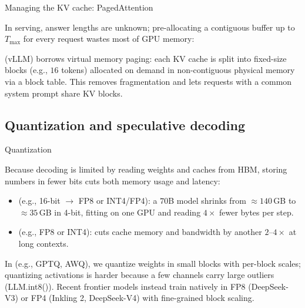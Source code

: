 \documentclass[11pt,aspectratio=169]{beamer}
\begin{document}
\begin{frame}{Managing the KV cache: PagedAttention}
    \setlength{\parskip}{4pt}

    In serving, answer lengths are unknown; pre-allocating a contiguous buffer
    up to $T_{\max}$ for every request wastes most of GPU memory:

    \centering
    
    \par\vspace{-0.3em}
    \justifying

     (vLLM) borrows virtual memory paging: each KV
    cache is split into fixed-size blocks (e.g., $16$ tokens) allocated on
    demand in non-contiguous physical memory via a block table. This removes
    fragmentation and lets requests with a common system prompt share KV
    blocks.


\end{frame}

\subsection{Quantization and speculative decoding}

\begin{frame}{Quantization}
    \setlength{\parskip}{6pt}

    Because decoding is limited by reading weights and caches from HBM,
    storing numbers in fewer bits cuts both memory usage and latency:
    \begin{itemize}
        \setlength{\itemsep}{4pt}
        \item {} (e.g., 16-bit $\to$ FP8 or
              INT4/FP4): a $70$B model shrinks from $\approx 140$\,GB to
              $\approx 35$\,GB in 4-bit, fitting on one GPU and reading
              $4\times$ fewer bytes per step.
        \item {} (e.g., FP8 or INT4): cuts cache
              memory and bandwidth by another $2$--$4\times$ at long contexts.
    \end{itemize}

    In  (e.g., GPTQ, AWQ), we quantize
    weights in small blocks with per-block scales; quantizing activations is
    harder because a few channels carry large outliers (LLM.int8()). Recent
    frontier models instead train natively in FP8 (DeepSeek-V3) or FP4
    (Inkling 2, DeepSeek-V4) with fine-grained block scaling.


\end{frame}
\end{document}
